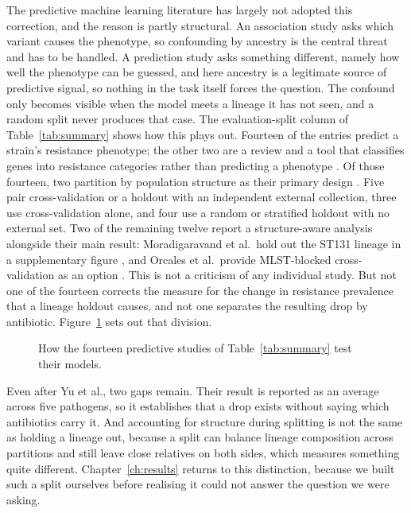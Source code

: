 The predictive machine learning literature has largely not adopted this correction, and the reason is partly structural. An association study asks which variant causes the phenotype, so confounding by ancestry is the central threat and has to be handled. A prediction study asks something different, namely how well the phenotype can be guessed, and here ancestry is a legitimate source of predictive signal, so nothing in the task itself forces the question. The confound only becomes visible when the model meets a lineage it has not seen, and a random split never produces that case. The evaluation-split column of Table~\ref{tab:summary} shows how this plays out. Fourteen of the entries predict a strain's resistance phenotype; the other two are a review \cite{Yun2024} and a tool that classifies genes into resistance categories rather than predicting a phenotype \cite{ArangoArgoty2018}. Of those fourteen, two partition by population structure as their primary design \cite{Yu2025, Hu2024}. Five pair cross-validation or a holdout with an independent external collection, three use cross-validation alone, and four use a random or stratified holdout with no external set. Two of the remaining twelve report a structure-aware analysis alongside their main result: Moradigaravand et al.\ hold out the ST131 lineage in a supplementary figure \cite{moradigaravand2018}, and Orcales et al.\ provide MLST-blocked cross-validation as an option \cite{Orcales2024}. This is not a criticism of any individual study. But not one of the fourteen corrects the measure for the change in resistance prevalence that a lineage holdout causes, and not one separates the resulting drop by antibiotic. Figure~\ref{fig:evalsplit_landscape} sets out that division.

\begin{figure}[htbp]
  \centering
  \resizebox{\textwidth}{!}{}
  \caption{How the fourteen predictive studies of Table~\ref{tab:summary} test
  their models.}
  \label{fig:evalsplit_landscape}
\end{figure}

Even after Yu et al., two gaps remain. Their result is reported as an average across five pathogens, so it establishes that a drop exists without saying which antibiotics carry it. And accounting for structure during splitting is not the same as holding a lineage out, because a split can balance lineage composition across partitions and still leave close relatives on both sides, which measures something quite different. Chapter~\ref{ch:results} returns to this distinction, because we built such a split ourselves before realising it could not answer the question we were asking.

